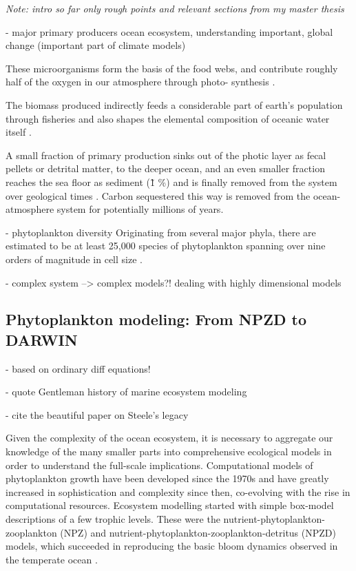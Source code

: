 \documentclass[journal abbreviations, manuscript]{copernicus}
\begin{document}

\textit{Note: intro so far only rough points and relevant sections from my master thesis}


- major primary producers ocean ecosystem, understanding important, global change (important part of climate models)


These microorganisms form the basis of the food webs, and contribute roughly half of the oxygen in our atmosphere through photo- synthesis \citep{Field2009}.

The biomass produced indirectly feeds a considerable part of earth’s population through fisheries \citep{Stock2017} and also shapes the elemental composition of oceanic water itself \citep{Redfield1958}.

A small fraction of primary production sinks out of the photic layer as fecal pellets or detrital matter, to the deeper ocean, and an even smaller fraction reaches the sea floor as sediment (\~ 1 \%) and is finally removed from the system over geological times \citep{Honjo2008}. Carbon sequestered this way is removed from the ocean-atmosphere system for potentially millions of years.

- phytoplankton diversity 
Originating from several major phyla, there are estimated to be at least 25,000 species of phytoplankton \citep{Falkowski2004a} spanning over nine orders of magnitude in cell size \citep{Sieburth1978PelagicFractions, Finkel2010}.

- complex system --> complex models?! dealing with highly dimensional models \citep{Dutkiewicz2020DimensionsDiversity}


\subsection{Phytoplankton modeling: From NPZD to DARWIN}
- based on ordinary diff equations!

- quote Gentleman history of marine ecosystem modeling \citep{Gentleman2003a}

- cite the beautiful paper on Steele's legacy \citep{Anderson2019RememberingEcosystems}

Given the complexity of the ocean ecosystem, it is necessary to aggregate our knowledge of the many smaller parts into comprehensive ecological models in order to understand the full-scale implications. Computational models of phytoplankton growth have been developed since the 1970s and have greatly increased in sophistication and complexity since then, co-evolving with the rise in computational resources. Ecosystem modelling started with simple box-model descriptions of a few trophic levels. These were the nutrient-phytoplankton-zooplankton (NPZ) and nutrient-phytoplankton-zooplankton-detritus (NPZD) models, which succeeded in reproducing the basic bloom dynamics observed in the temperate ocean \citep{Evans1985ACycles, Fasham1990a}. 
\end{document}
